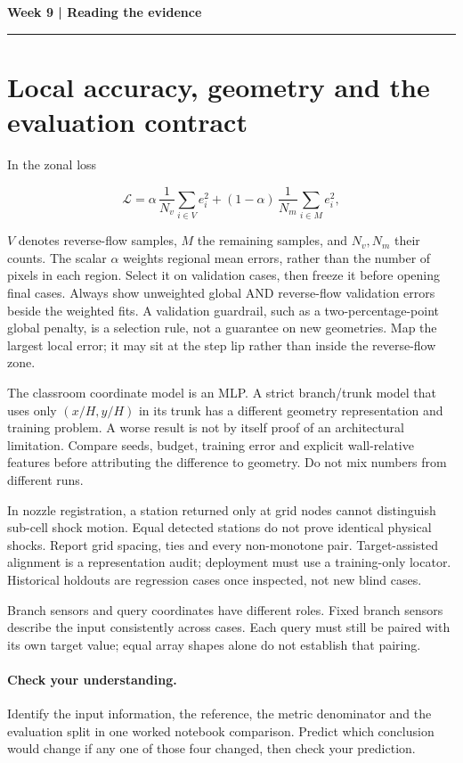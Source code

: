 \documentclass[11pt]{article}
\begin{document}
\noindent\textbf{Week 9 | Reading the evidence}\par\medskip\hrule\medskip
\section*{Local accuracy, geometry and the evaluation contract}
In the zonal loss

\[\mathcal L=\alpha\,\frac{1}{N_v}\sum_{i\in V}e_i^2
+(1-\alpha)\,\frac{1}{N_m}\sum_{i\in M}e_i^2,\]

$V$ denotes reverse-flow samples, $M$ the remaining samples, and $N_v,N_m$
their counts. The scalar $\alpha$ weights regional mean errors, rather than
the number of pixels in each region. Select it on validation cases, then freeze
it before opening final cases. Always show unweighted global AND reverse-flow
validation errors beside the weighted fits. A validation guardrail, such as a
two-percentage-point global penalty, is a selection rule, not a guarantee on new
geometries. Map the largest local error; it may sit at the step lip rather than
inside the reverse-flow zone.

The classroom coordinate model is an MLP. A strict branch/trunk model that uses
only $(x/H,y/H)$ in its trunk has a different geometry representation and training
problem. A worse result is not by itself proof of an architectural limitation.
Compare seeds, budget, training error and explicit wall-relative features before
attributing the difference to geometry. Do not mix numbers from different runs.

In nozzle registration, a station returned only at grid nodes cannot distinguish
sub-cell shock motion. Equal detected stations do not prove identical physical
shocks. Report grid spacing, ties and every non-monotone pair. Target-assisted
alignment is a representation audit; deployment must use a training-only locator.
Historical holdouts are regression cases once inspected, not new blind cases.

Branch sensors and query coordinates have different roles. Fixed branch sensors
describe the input consistently across cases. Each query must still be paired
with its own target value; equal array shapes alone do not establish that pairing.
\paragraph{Check your understanding.}
Identify the input information, the reference, the metric denominator and the
evaluation split in one worked notebook comparison. Predict which conclusion
would change if any one of those four changed, then check your prediction.
\end{document}
